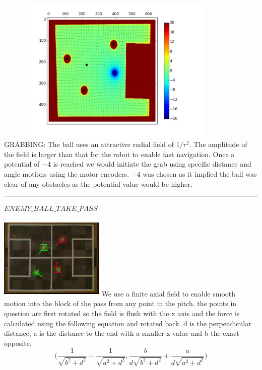 \documentclass[a4paper,12pt]{article}
\begin{document}
\begin{minipage}{0.5\textwidth}\raggedright
\includegraphics[height=70mm,width=115mm]{p3.jpg}
GRABBING: The ball uses an attractive radial field of $1/r^2$. The amplitude of the field is larger than that for the robot to enable fast navigation. Once a potential of $-4$ is reached we would initiate the grab using specific distance and angle motions using the motor encoders. $-4$ was chosen as it implied the ball was clear of any obstacles as the potential value would be higher.
\end{minipage}\newline\newline
\rule{\textwidth}{1pt}\newline
$ENEMY\_BALL\_TAKE\_PASS$ \newline \newline
\begin{minipage}{0.5\textwidth}\raggedright
\includegraphics[height=40mm,width=50mm]{v1_2.jpg}\newline\newline
We use a finite axial field to enable smooth motion into the block of the pass from any point in the pitch. the points in question are first rotated so the field is flush with the x axis and the force is calculated using the following equation and rotated back. d is the perpendicular distance, a is the distance to the end with a smaller x value and b the exact opposite.
 $$\Big(\frac{1}{\sqrt{b^2 + d^2}}-\frac{1}{\sqrt{a^2 + d^2}},\frac{b}{d\sqrt{b^2 + d^2}}+\frac{a}{d\sqrt{a^2 + d^2}}\Big)$$
\end{minipage}
\end{document}
